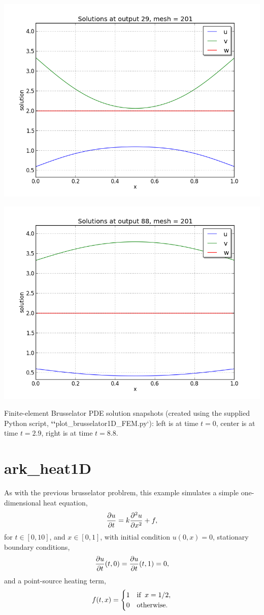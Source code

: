 \documentclass[letterpaper,10pt,english]{sphinxmanual}
\begin{document}
\includegraphics[width=0.300\linewidth]{plot-ark_brusselator1D_FEM_2.png}

\includegraphics[width=0.300\linewidth]{plot-ark_brusselator1D_FEM_3.png}

Finite-element Brusselator PDE solution snapshots (created using the
supplied Python script, {\color{red}\bfseries{}{}`{}`}plot\_brusselator1D\_FEM.py{}`): left is at time
$t=0$, center is at time $t=2.9$, right is at time
$t=8.8$.


\section{ark\_heat1D}
\label{c_serial:ark-heat1d}\label{c_serial:id25}
As with the previous brusselator problrem, this example simulates a
simple one-dimensional heat equation,
\begin{gather}
\begin{split}\frac{\partial u}{\partial t} = k \frac{\partial^2 u}{\partial x^2} + f,\end{split}\notag
\end{gather}
for $t \in [0, 10]$, and $x \in [0, 1]$, with initial
condition $u(0,x) = 0$, stationary boundary conditions,
\begin{gather}
\begin{split}\frac{\partial u}{\partial t}(t,0) = \frac{\partial u}{\partial t}(t,1) = 0,\end{split}\notag
\end{gather}
and a point-source heating term,
\begin{gather}
\begin{split}f(t,x) = \begin{cases} 1 & \text{if}\;\; x=1/2, \\
                       0 & \text{otherwise}. \end{cases}\end{split}\notag
\end{gather}
\end{document}
